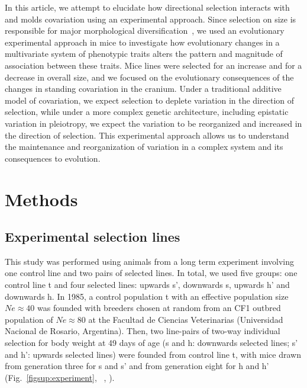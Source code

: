 \begin{refsection}
In this article, we attempt to elucidate how directional selection
interacts with and molds covariation using an experimental approach.
Since selection on size is responsible for major morphological
diversification~\parencite{Baker2015-ti}, we used an evolutionary experimental
approach in mice to investigate how evolutionary changes in a
multivariate system of phenotypic traits alters the pattern and
magnitude of association between these traits. Mice lines were selected
for an increase and for a decrease in overall size, and we focused on
the evolutionary consequences of the changes in standing covariation in
the cranium. Under a traditional additive model of covariation, we
expect selection to deplete variation in the direction of selection,
while under a more complex genetic architecture, including epistatic
variation in pleiotropy, we expect the variation to be reorganized and
increased in the direction of selection. This experimental approach
allows us to understand the maintenance and reorganization of variation
in a complex system and its consequences to evolution.

\section{Methods}

\subsection{Experimental selection lines}

This study was performed using animals from a long term experiment
involving one control line and two pairs of selected lines. In total, we
used five groups: one control line t and four selected lines: upwards
s', downwards s, upwards h' and downwards h. In 1985, a control
population t with an effective population size \(Ne \approx 40\) was
founded with breeders chosen at random from an CF1 outbred population of
\(Ne \approx 80\) at the Facultad de Ciencias Veterinarias (Universidad
Nacional de Rosario, Argentina). Then, two line-pairs of two-way
individual selection for body weight at 49 days of age (s and h:
downwards selected lines; s' and h': upwards selected lines) were
founded from control line t, with mice drawn from generation three for s
and s' and from generation eight for h and h' (Fig.~\ref{figsup:experiment}, ~\textcite{Oyarzabal2011-uk},
\textcite{Renny2014-on}).


\end{refsection}
